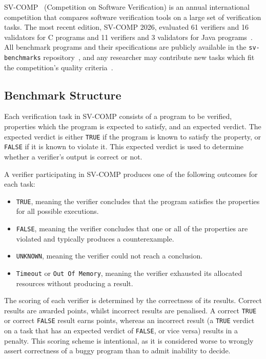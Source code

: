 \documentclass[11pt,titlepage,openright]{book}
\begin{document}
SV-COMP~\cite{SV-COMP} (Competition on Software Verification) is an annual
international competition that compares software verification tools on a
large set of verification tasks.
The most recent edition, SV-COMP 2026, evaluated 61 verifiers and
16 validators for C programs and 11 verifiers and 3 validators for Java
programs~\cite{SV-COMP2026}.
All benchmark programs and their specifications are publicly
available in the \texttt{sv-benchmarks} repository~\cite{SVBenchmarks}, and any researcher may
contribute new tasks which fit the competition's quality
criteria~\cite{SV-COMP}.
 
\subsection{Benchmark Structure}
\label{sec:svcomp-structure}
 
Each verification task in SV-COMP consists of a program to be
verified, properties which the program is expected to satisfy, and an
expected verdict.
The expected verdict is either \texttt{TRUE} if the program is known to
satisfy the property, or \texttt{FALSE} if it is known to violate it.
This expected verdict is used to determine whether a verifier's output is
correct or not.
 
A verifier participating in SV-COMP produces one of the following outcomes
for each task:
 
\begin{itemize}
  \item \texttt{TRUE}, meaning the verifier concludes that the program satisfies
        the properties for all possible executions.
  \item \texttt{FALSE}, meaning the verifier concludes that one or all of the
  properties are violated and typically produces a counterexample.
  \item \texttt{UNKNOWN}, meaning the verifier could not reach a conclusion.
  \item \texttt{Timeout} or \texttt{Out Of Memory}, meaning the verifier exhausted
        its allocated resources without producing a result.
\end{itemize}
 
The scoring of each verifier is determined by the correctness of its results.
Correct results are awarded points, whilst incorrect results are penalised.
A correct \texttt{TRUE} or correct \texttt{FALSE} result earns points,
whereas an incorrect result (a \texttt{TRUE} verdict on a task that has an
expected verdict of \texttt{FALSE}, or vice versa) results in a penalty.
This scoring scheme is intentional, as it is considered worse to
wrongly assert correctness of a buggy program than to %
admit inability to decide.
 
\end{document}
